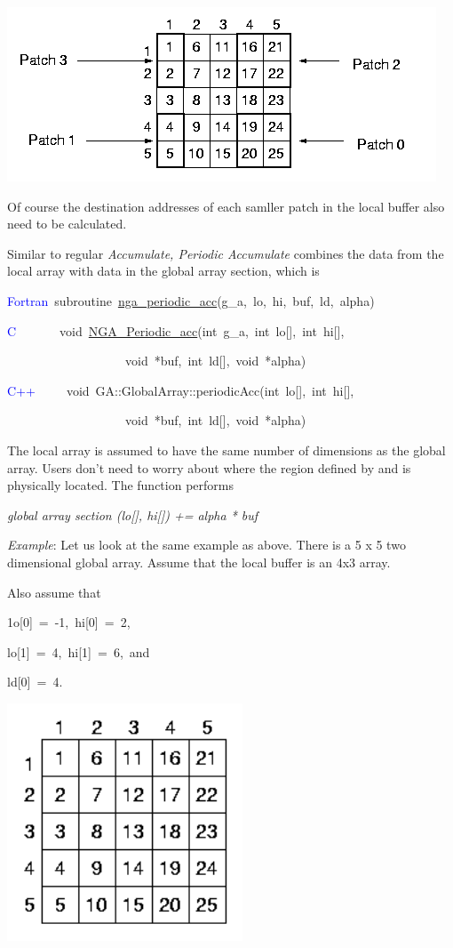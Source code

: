\includegraphics[width=0.7\paperwidth]{periodic4}

Of course the destination addresses of each samller patch in the local
buffer also need to be calculated.

Similar to regular \emph{Accumulate, Periodic Accumulate} combines
the data from the local array with data in the global array section,
which is
\begin{lyxcode}
\textcolor{blue}{Fortran}~subroutine~\href{http://www.emsl.pnl.gov/docs/global/ga_ops.html\#ga_periodic_acc}{nga\_{}periodic\_{}acc}(g\_a,~lo,~hi,~buf,~ld,~alpha)~

\textcolor{blue}{C}~~~~~~~void~\href{http://www.emsl.pnl.gov/docs/global/c_nga_ops.html\#ga_periodic_acc}{NGA\_{}Periodic\_{}acc}(int~g\_a,~int~lo{[}{]},~int~hi{[}{]},~

~~~~~~~~~~~~~~~~~~~void~{*}buf,~int~ld{[}{]},~void~{*}alpha)~

\textcolor{blue}{C++~}~~~~void~GA::GlobalArray::periodicAcc(int~lo{[}{]},~int~hi{[}{]},~

~~~~~~~~~~~~~~~~~~~void~{*}buf,~int~ld{[}{]},~void~{*}alpha)
\end{lyxcode}
The local array is assumed to have the same number of dimensions as
the global array. Users don't need to worry about where the region
defined by \texttt{} and \texttt{} is physically
located. The function performs

\emph{global array section (lo{[}{]}, hi{[}{]}) += alpha {*} buf}

\emph{Example}: Let us look at the same example as above. There is
a 5 x 5 two dimensional global array. Assume that the local buffer
is an 4x3 array. 

Also assume that
\begin{lyxcode}
1o{[}0{]}~=~-1,~hi{[}0{]}~=~2,~

lo{[}1{]}~=~4,~hi{[}1{]}~=~6,~and~

ld{[}0{]}~=~4.
\end{lyxcode}
\includegraphics[width=7cm]{periodic1}

